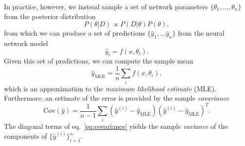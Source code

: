 In practice, however, we instead sample a set of network parameters $\{\theta_1, ..., \theta_n\}$ from the posterior distribution
\begin{equation}
  P(\theta|D) \propto P(D|\theta)P(\theta),
\end{equation}
from which we can produce a set of predictions $\{\hat{y}_1,\ldots \hat{y}_n\}$ from the neural network model 
\begin{equation}
  \hat{y}_i = f(x, \theta_i).
\end{equation}
Given this set of predictions, we can compute the sample mean
\begin{equation}
  \hat{y}_\text{MLE} = \frac{1}{n}\sum_i f(x, \theta_i),
\end{equation}
which is an approximation to the \textit{maximum likelihood estimate} (MLE). Furthermore, an estimate of the error is provided by the sample \textit{covariance}
\begin{equation}\label{eq:covariance}
  \text{Cov}(\hat{y}) = \frac{1}{n-1}\sum_i (\hat{y}^{(i)} - \hat{y}_\text{MLE})(\hat{y}^{(i)} - \hat{y}_\text{MLE})^T.
\end{equation}
The diagonal terms of eq.~\eqref{eq:covariance} yields the sample \textit{variance} of the components of $\{\hat{y}^{(i)}\}_{i=1}^n$.


